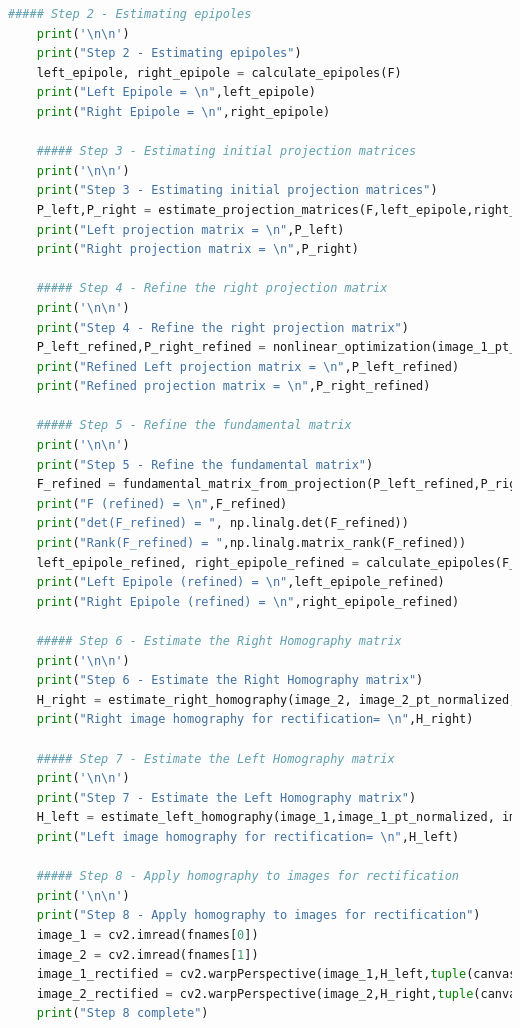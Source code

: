 \documentclass{article}
\begin{document}
\begin{lstlisting}[language=Python]
	##### Step 2 - Estimating epipoles
	print('\n\n')
	print("Step 2 - Estimating epipoles")
	left_epipole, right_epipole = calculate_epipoles(F)
	print("Left Epipole = \n",left_epipole)
	print("Right Epipole = \n",right_epipole)

	##### Step 3 - Estimating initial projection matrices
	print('\n\n')
	print("Step 3 - Estimating initial projection matrices")
	P_left,P_right = estimate_projection_matrices(F,left_epipole,right_epipole)
	print("Left projection matrix = \n",P_left)
	print("Right projection matrix = \n",P_right)

	##### Step 4 - Refine the right projection matrix
	print('\n\n')
	print("Step 4 - Refine the right projection matrix")
	P_left_refined,P_right_refined = nonlinear_optimization(image_1_pt_normalized,image_2_pt_normalized,P_left,P_right)
	print("Refined Left projection matrix = \n",P_left_refined)
	print("Refined projection matrix = \n",P_right_refined)

	##### Step 5 - Refine the fundamental matrix
	print('\n\n')
	print("Step 5 - Refine the fundamental matrix")
	F_refined = fundamental_matrix_from_projection(P_left_refined,P_right_refined)
	print("F (refined) = \n",F_refined)
	print("det(F_refined) = ", np.linalg.det(F_refined))
	print("Rank(F_refined) = ",np.linalg.matrix_rank(F_refined))
	left_epipole_refined, right_epipole_refined = calculate_epipoles(F_refined)
	print("Left Epipole (refined) = \n",left_epipole_refined)
	print("Right Epipole (refined) = \n",right_epipole_refined)

	##### Step 6 - Estimate the Right Homography matrix
	print('\n\n')
	print("Step 6 - Estimate the Right Homography matrix")
	H_right = estimate_right_homography(image_2, image_2_pt_normalized, right_epipole_refined, P_right_refined)
	print("Right image homography for rectification= \n",H_right)

	##### Step 7 - Estimate the Left Homography matrix
	print('\n\n')
	print("Step 7 - Estimate the Left Homography matrix")
	H_left = estimate_left_homography(image_1,image_1_pt_normalized, image_2_pt_normalized, left_epipole_refined, P_left_refined, P_right_refined, H_right)
	print("Left image homography for rectification= \n",H_left)

	##### Step 8 - Apply homography to images for rectification
	print('\n\n')
	print("Step 8 - Apply homography to images for rectification")
	image_1 = cv2.imread(fnames[0])
	image_2 = cv2.imread(fnames[1])
	image_1_rectified = cv2.warpPerspective(image_1,H_left,tuple(canvas_size))
	image_2_rectified = cv2.warpPerspective(image_2,H_right,tuple(canvas_size))
	print("Step 8 complete")


\end{lstlisting}
\end{document}
